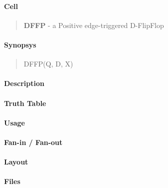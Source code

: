 \label{DFFP}
\paragraph{Cell}
\begin{quote}
    \textbf{DFFP} - a Positive edge-triggered D-FlipFlop
\end{quote}

\paragraph{Synopsys}
\begin{quote}
    DFFP(Q, D, X)
\end{quote}

\paragraph{Description}

%

\paragraph{Truth Table}
%

\paragraph{Usage}

\paragraph{Fan-in / Fan-out}

\paragraph{Layout}

\paragraph{Files}
